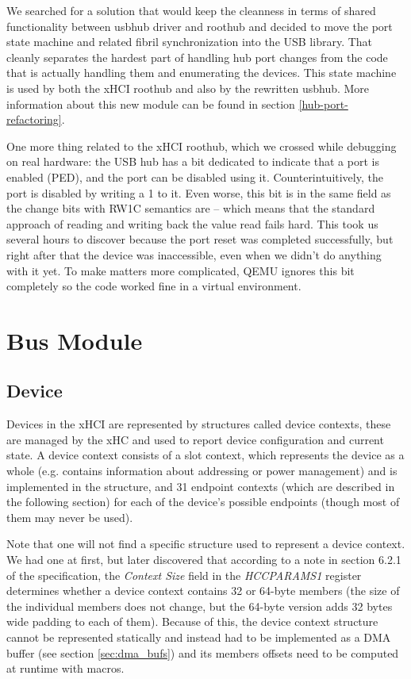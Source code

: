 We searched for a solution that would keep the cleanness in terms of shared
functionality between usbhub driver and roothub and decided to move the port
state machine and related fibril synchronization into the USB library. That
cleanly separates the hardest part of handling hub port changes from the code
that is actually handling them and enumerating the devices. This state machine
is used by both the xHCI roothub and also by the rewritten usbhub. More
information about this new module can be found in section \ref{hub-port-refactoring}.

One more thing related to the xHCI roothub, which we crossed while debugging on
real hardware: the USB hub has a bit dedicated to indicate that a port is
enabled (PED), and the port can be disabled using it. Counterintuitively, the
port is disabled by writing a 1 to it. Even worse, this bit is in the same
field as the change bits with RW1C semantics are -- which means that the
standard approach of reading and writing back the value read fails hard. This
took us several hours to discover because the port reset was completed
successfully, but right after that the device was inaccessible, even when we
didn't do anything with it yet. To make matters more complicated, QEMU ignores
this bit completely so the code worked fine in a virtual environment.

\section{Bus Module}


\subsection{Device}

Devices in the xHCI are represented by structures called device contexts, these are
managed by the xHC and used to report device configuration and current state. A device
context consists of a slot context, which represents the device as a whole (e.g. contains
information about addressing or power management) and is implemented in the 
structure, and 31 endpoint contexts (which are described in the following section)
for each of the device's possible endpoints (though most of them may never be used).

Note that one will not find a specific structure used to represent a device context. We had
one at first, but later discovered that according to a note in section 6.2.1 of the
specification, the \textit{Context Size} field in the \textit{HCCPARAMS1} register determines whether
a device context contains 32 or 64-byte members (the size of the individual members does
not change, but the 64-byte version adds 32 bytes wide padding to each of them). Because
of this, the device context structure cannot be represented statically and instead had to be
implemented as a DMA buffer (see section \ref{sec:dma_bufs}) and its members offsets
need to be computed at runtime with macros.

